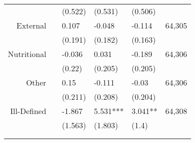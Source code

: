 \begin{table}[H]
\begin{footnotesize}
\begin{center}
{\begin{threeparttable}[b]
\begin{tabular}{rrrrrr}
          &       & \multicolumn{1}{l}{(0.522)} & \multicolumn{1}{l}{(0.531)} & \multicolumn{1}{l}{(0.506)} &  \\
    \multicolumn{1}{p{15.145em}}{External} &       & \multicolumn{1}{l}{0.107} & \multicolumn{1}{l}{-0.048} & \multicolumn{1}{l}{-0.114} & \multicolumn{1}{c}{     64,305 } \\
          &       & \multicolumn{1}{l}{(0.191)} & \multicolumn{1}{l}{(0.182)} & \multicolumn{1}{l}{(0.163)} &  \\
    \multicolumn{1}{p{15.145em}}{Nutritional} &       & \multicolumn{1}{l}{-0.036} & \multicolumn{1}{l}{0.031} & \multicolumn{1}{l}{-0.189} & \multicolumn{1}{c}{     64,306 } \\
          &       & \multicolumn{1}{l}{(0.22)} & \multicolumn{1}{l}{(0.205)} & \multicolumn{1}{l}{(0.205)} &  \\
    \multicolumn{1}{p{15.145em}}{Other} &       & \multicolumn{1}{l}{0.15} & \multicolumn{1}{l}{-0.111} & \multicolumn{1}{l}{-0.03} & \multicolumn{1}{c}{     64,306 } \\
          &       & \multicolumn{1}{l}{(0.211)} & \multicolumn{1}{l}{(0.208)} & \multicolumn{1}{l}{(0.204)} &  \\
    \multicolumn{1}{p{15.145em}}{Ill-Defined} &       & \multicolumn{1}{l}{-1.867} & \multicolumn{1}{l}{5.531***} & \multicolumn{1}{l}{3.041**} & \multicolumn{1}{c}{     64,308 } \\
          &       & \multicolumn{1}{l}{(1.563)} & \multicolumn{1}{l}{(1.803)} & \multicolumn{1}{l}{(1.4)} &  \\
          &       &       &       &       &  \\
    \midrule
    \midrule
          &       &       &       &       &  \\
    \end{tabular}%
    
  \label{table:imr}%

\end{threeparttable}
}
\end{center}
\end{footnotesize}
\end{table}
